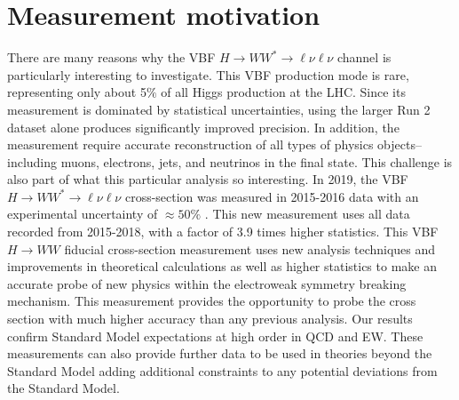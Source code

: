 \section{Measurement motivation}
There are many reasons why the VBF $H\rightarrow WW^*\rightarrow\ell\nu\ell\nu$ channel is particularly interesting to investigate. This VBF production mode is rare, representing only about 5$\%$ of all Higgs production at the LHC. Since its measurement is dominated by statistical uncertainties, using the larger Run 2 dataset alone produces significantly improved precision. In addition, the measurement require accurate reconstruction of all types of physics objects--including muons, electrons, jets, and neutrinos in the final state. This challenge is also part of what this particular analysis so interesting. In 2019, the VBF $H\rightarrow WW^* \rightarrow \ell\nu\ell\nu$ cross-section was measured in 2015-2016 data with an experimental uncertainty of $\approx50\%$ \cite{Aaboud_2019}. This new measurement uses all data recorded from 2015-2018, with a factor of 3.9 times higher statistics. This VBF $H\rightarrow WW$ fiducial cross-section measurement uses new analysis techniques and improvements in theoretical calculations as well as higher statistics to make an accurate probe of new physics within the electroweak symmetry breaking mechanism. This measurement provides the opportunity to probe the cross section with much higher accuracy than any previous analysis. Our results confirm Standard Model expectations at high order in QCD and EW. These measurements can also provide further data to be used in theories beyond the Standard Model adding additional constraints to any potential deviations from the Standard Model. 

